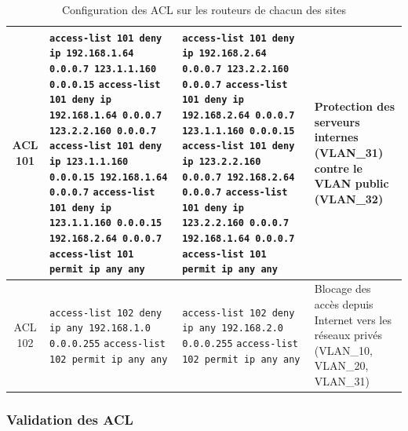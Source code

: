 \documentclass[12pt,a4paper, oneside]{memoir}
\begin{document}
\begin{landscape}
\begin{table}[]
\begin{tabular}{|c|p{8cm}|p{8cm}|p{5cm}|}
		ACL 101 &
		\texttt{access-list 101 deny ip 192.168.1.64 0.0.0.7 123.1.1.160 0.0.0.15} \newline\newline
		\texttt{access-list 101 deny ip 192.168.1.64 0.0.0.7 123.2.2.160 0.0.0.7} \newline\newline
		\texttt{access-list 101 deny ip 123.1.1.160 0.0.0.15 192.168.1.64 0.0.0.7} \newline\newline
		\texttt{access-list 101 deny ip 123.1.1.160 0.0.0.15 192.168.2.64 0.0.0.7} \newline\newline
		\texttt{access-list 101 permit ip any any}
		&
		\texttt{access-list 101 deny ip 192.168.2.64 0.0.0.7 123.2.2.160 0.0.0.7} \newline\newline
		\texttt{access-list 101 deny ip 192.168.2.64 0.0.0.7 123.1.1.160 0.0.0.15} \newline\newline
		\texttt{access-list 101 deny ip 123.2.2.160 0.0.0.7 192.168.2.64 0.0.0.7} \newline\newline
		\texttt{access-list 101 deny ip 123.2.2.160 0.0.0.7 192.168.1.64 0.0.0.7} \newline\newline
		\texttt{access-list 101 permit ip any any}
		&
		Protection des serveurs internes (VLAN\_31) contre le VLAN public (VLAN\_32)
		\\
		\hline
		
		ACL 102 &
		\texttt{access-list 102 deny ip any 192.168.1.0 0.0.0.255} \newline\newline
		\texttt{access-list 102 permit ip any any}
		&
		\texttt{access-list 102 deny ip any 192.168.2.0 0.0.0.255} \newline\newline
		\texttt{access-list 102 permit ip any any}
		&
		Blocage des accès depuis Internet vers les réseaux privés (VLAN\_10, VLAN\_20, VLAN\_31)
		\\
		\hline
	\end{tabular}
	\caption{Configuration des ACL sur les routeurs de chacun des sites}
	\label{tab:config_acl}
\end{table}
\end{landscape}

\subsubsection{Validation des ACL}
\end{document}
